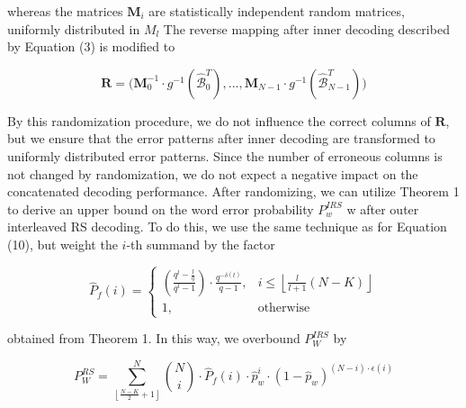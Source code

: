 \documentclass[fontsize=12pt]{article}
\begin{document}
whereas the matrices
$\mathbf{M}_i$ are statistically independent random
matrices, uniformly distributed in $M_l$ The reverse mapping
after inner decoding described by Equation (3) is modified to

$$\mathbf{R}=\Big(\mathbf{M}_0^{-1} \cdot g^{-1}(\hat{\mathcal{B}}^T_0),...,\mathbf{M}_{N-1}\cdot g^{-1}(\hat{\mathcal{B}}^T_{N-1})\Big) $$

By this randomization procedure, we do not influence the
correct columns of $\mathbf{R}$, but we ensure that the error patterns
after inner decoding are transformed to uniformly distributed
error patterns. Since the number of erroneous columns is not
changed by randomization, we do not expect a negative impact
on the concatenated decoding performance. After randomizing,
we can utilize Theorem 1 to derive an upper bound on
the word error probability 
 $P_w^{IRS}$
w after outer interleaved RS decoding. To do this, we use the same technique as
for Equation (10), but weight the $i$-th summand by the factor

$$
    \hat{P}_f(i)=
    \begin{cases}
       (\frac{q^l -\frac{l}{q}}{q^l-1}) \cdot \frac{q^{-\delta(t)}}{q-1}, & i \leq  \left \lfloor \frac{l}{l+1} ({N - K}) \right \rfloor \\
      1, & \text{otherwise}
    \end{cases}
  $$
  
  obtained from Theorem 1. In this way, we overbound 
$P_W^{IRS}$ by

\begin{equation}
P_W^{RS} = \sum_{ \left \lfloor \frac{N-K}{2}+1 \right \rfloor }^{N}\binom{N}{i}\cdot \hat{P}_f(i) \cdot \hat{p}_w^i\cdot(1-\hat{p}_w)^{(N-i)\cdot \epsilon(i) }
\end{equation}
\end{document}
